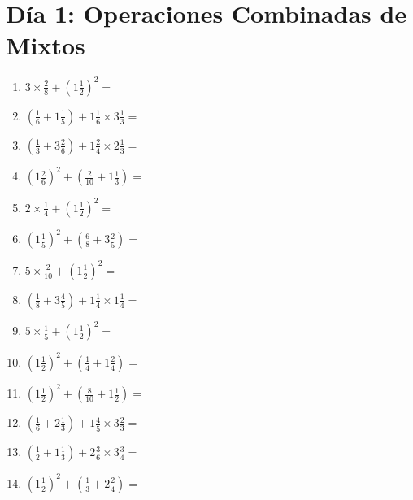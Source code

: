 \documentclass[12pt]{article}
\begin{document}
\section*{Día 1: Operaciones Combinadas de Mixtos}
\begin{enumerate}
\item \large $ 3 \times \frac{2}{8} + (1 \frac{1}{2})^2 = $ \vspace{1.8cm}
\item \large $ (\frac{1}{6} + 1 \frac{1}{5}) + 1 \frac{1}{6} \times 3 \frac{1}{3} = $ \vspace{1.8cm}
\item \large $ (\frac{1}{3} + 3 \frac{2}{6}) + 1 \frac{2}{4} \times 2 \frac{1}{3} = $ \vspace{1.8cm}
\item \large $ (1 \frac{2}{6})^2 + (\frac{2}{10} + 1 \frac{1}{3}) = $ \vspace{1.8cm}
\item \large $ 2 \times \frac{1}{4} + (1 \frac{1}{2})^2 = $ \vspace{1.8cm}
\item \large $ (1 \frac{1}{5})^2 + (\frac{6}{8} + 3 \frac{2}{5}) = $ \vspace{1.8cm}
\item \large $ 5 \times \frac{2}{10} + (1 \frac{1}{2})^2 = $ \vspace{1.8cm}
\item \large $ (\frac{1}{8} + 3 \frac{4}{5}) + 1 \frac{1}{4} \times 1 \frac{1}{4} = $ \vspace{1.8cm}
\item \large $ 5 \times \frac{1}{5} + (1 \frac{1}{2})^2 = $ \vspace{1.8cm}
\item \large $ (1 \frac{1}{2})^2 + (\frac{1}{4} + 1 \frac{2}{4}) = $ \vspace{1.8cm}
\newpage
\item \large $ (1 \frac{1}{2})^2 + (\frac{8}{10} + 1 \frac{1}{2}) = $ \vspace{1.8cm}
\item \large $ (\frac{1}{6} + 2 \frac{1}{3}) + 1 \frac{4}{5} \times 3 \frac{2}{3} = $ \vspace{1.8cm}
\item \large $ (\frac{1}{2} + 1 \frac{1}{3}) + 2 \frac{3}{6} \times 3 \frac{3}{4} = $ \vspace{1.8cm}
\item \large $ (1 \frac{1}{2})^2 + (\frac{1}{3} + 2 \frac{2}{4}) = $ \vspace{1.8cm}

\end{enumerate}
\end{document}
